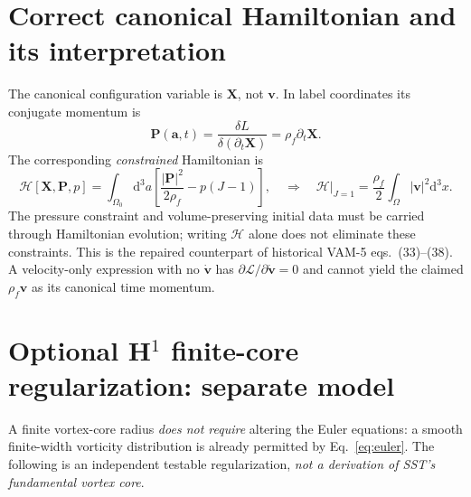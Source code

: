 \documentclass[11pt,a4paper]{article}
\newcommand{\rhoF}{\rho_{\!f}}
\newcommand{\vv}{\mathbf v}
\newcommand{\XX}{\mathbf X}
\newcommand{\dd}{\mathrm d}
\begin{document}
\section{Correct canonical Hamiltonian and its interpretation}\label{sec:hamilton}
The canonical configuration variable is $\XX$, not $\vv$. In label coordinates its conjugate momentum is
\begin{equation}
\boxed{\mathbf P(\mathbf a,t)=\frac{\delta L}{\delta(\partial_t\XX)}=\rhoF\partial_t\XX.}
\end{equation}
The corresponding \emph{constrained} Hamiltonian is
\begin{equation}\label{eq:ham}
\mathscr H[\XX,\mathbf P,p]=\int_{\Omega_0}\dd^3a
\left[\frac{|\mathbf P|^2}{2\rhoF}-p(J-1)\right],
\quad\Rightarrow\quad
\boxed{\mathscr H\big|_{J=1}=\frac{\rhoF}{2}\int_\Omega |\vv|^2\dd^3x.}
\end{equation}
The pressure constraint and volume-preserving initial data must be carried through Hamiltonian evolution; writing $\mathscr H$ alone does not eliminate these constraints. This is the repaired counterpart of historical VAM-5 eqs.~(33)--(38). A velocity-only expression with no $\dot{\vv}$ has $\partial\mathcal L/\partial\dot{\vv}=0$ and cannot yield the claimed $\rhoF\vv$ as its canonical time momentum.

\section{Optional H$^1$ finite-core regularization: separate model}\label{sec:alpha}
A finite vortex-core radius \emph{does not require} altering the Euler equations: a smooth finite-width vorticity distribution is already permitted by Eq.~\eqref{eq:euler}. The following is an independent testable regularization, \emph{not a derivation of SST's fundamental vortex core}.
\end{document}
